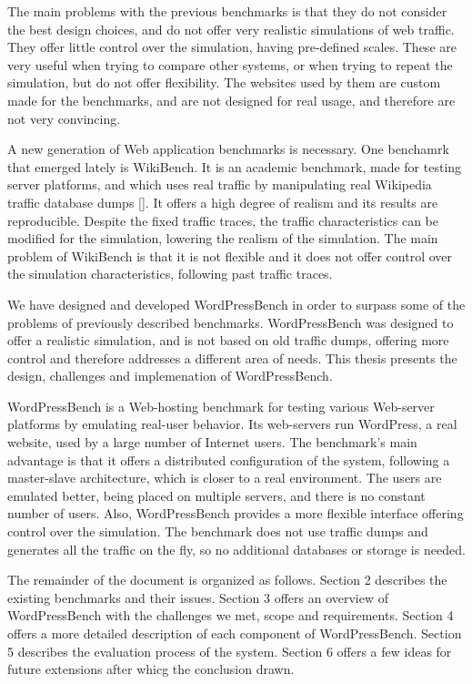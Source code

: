 The main problems with the previous benchmarks is that they do not consider the best design choices, and do not offer very realistic simulations of web traffic. They offer little control over the simulation, having pre-defined scales. These are very useful when trying to compare other systems, or when trying to repeat the simulation, but do not offer flexibility. The websites used by them are custom made for the benchmarks, and are not designed for real usage, and therefore are not very convincing.

A new generation of Web application benchmarks is necessary. One benchamrk that emerged lately is WikiBench. It is an academic  benchmark, made for testing server platforms, and which uses real traffic by manipulating real Wikipedia traffic database dumps []. It offers a high degree of realism and its results are reproducible. Despite the fixed traffic traces, the traffic characteristics can be modified for the simulation, lowering the realism of the simulation. The main problem of WikiBench is that it is not flexible and it does not offer control over the simulation characteristics, following past traffic traces.

We have designed and developed WordPressBench in order to surpass some of the problems of previously described benchmarks. WordPressBench was designed to offer a realistic simulation, and is not based on old traffic dumps, offering more control and therefore addresses a different area of needs. This thesis presents the design, challenges and implemenation of WordPressBench.

WordPressBench is a Web-hosting benchmark for testing various Web-server platforms by emulating real-user behavior. Its web-servers run WordPress, a real website, used by a large number of Internet users. The benchmark's main advantage is that it offers a distributed configuration of the system, following a master-slave architecture, which is closer to a real environment. The users are emulated better, being placed on multiple servers, and there is no constant number of users. Also, WordPressBench provides a more flexible interface offering control over the simulation. The benchmark does not use traffic dumps and generates all the traffic on the fly, so no additional databases or storage is needed.

The remainder of the document is organized as follows. Section 2 describes the existing benchmarks and their issues. Section 3 offers an overview of WordPressBench with the challenges we met, scope and requirements. Section 4 offers a more detailed description of each component of  WordPressBench. Section 5 describes the evaluation process of the system.
Section 6 offers a few ideas for future extensions after whicg the conclusion drawn.
